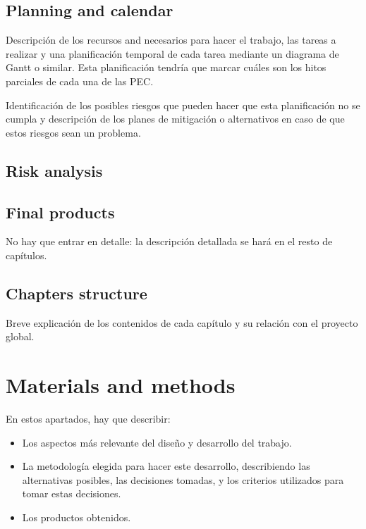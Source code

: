 \documentclass[ENG, BIB]{TFUOC}%
\begin{document}
\section{Planning and calendar}

Descripción de los recursos and necesarios para hacer el trabajo, las tareas a realizar y una planificación temporal de cada tarea mediante un diagrama de Gantt o similar. Esta planificación tendría que marcar cuáles son los hitos parciales de cada una de las PEC.

Identificación de los posibles riesgos que pueden hacer que esta planificación no se cumpla y descripción de los planes de mitigación o alternativos en caso de que estos riesgos sean un problema.

\section{Risk analysis}

\section{Final products}
No hay que entrar en detalle: la descripción detallada se hará en el resto de capítulos.

\section{Chapters structure}
Breve explicación de los contenidos de cada capítulo y su relación con el proyecto global.




\chapter{Materials and methods}
En estos apartados, hay que describir:
\begin{itemize}
    \item Los aspectos más relevante del diseño y desarrollo del trabajo.
    \item La metodología elegida para hacer este desarrollo, describiendo las alternativas posibles, las decisiones tomadas, y los criterios utilizados para tomar estas decisiones.
    \item Los productos obtenidos.
\end{itemize}
\end{document}
